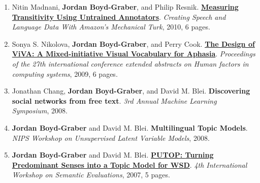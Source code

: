 {\begin{enumerate}
	 \item Nitin Madnani, {\bf Jordan Boyd-Graber}, and Philip Resnik.  {\bf \href{http://cs.umd.edu/~jbg//docs/madnani-boyd-graber-turk-workshop.pdf}{Measuring Transitivity Using Untrained Annotators}}.  \emph{Creating Speech and Language Data With Amazon's Mechanical Turk}, 2010, 6 pages.

	 \item Sonya S. Nikolova, {\bf Jordan Boyd-Graber}, and Perry Cook.  {\bf \href{http://cs.umd.edu/~jbg//docs/2009_chi_exabs_viva.pdf}{The Design of ViVA: A Mixed-initiative Visual Vocabulary for Aphasia}}.  \emph{Proceedings of the 27th international conference extended abstracts on Human factors in computing systems}, 2009, 6 pages.

	 \item Jonathan Chang, {\bf Jordan Boyd-Graber}, and David M. Blei.  {\bf Discovering social networks from free text}.  \emph{3rd Annual Machine Learning Symposium}, 2008.

	 \item {\bf Jordan Boyd-Graber} and David M. Blei.  {\bf Multilingual Topic Models}.  \emph{NIPS Workshop on Unsupervised Latent Variable Models}, 2008.

	 \item {\bf Jordan Boyd-Graber} and David M. Blei.  {\bf \href{http://cs.umd.edu/~jbg//docs/jbg-SEMEVAL07.pdf}{{PUTOP}: {T}urning Predominant Senses into a Topic Model for {WSD}}}.  \emph{4th International Workshop on Semantic Evaluations}, 2007, 5 pages.


\end{enumerate}
}